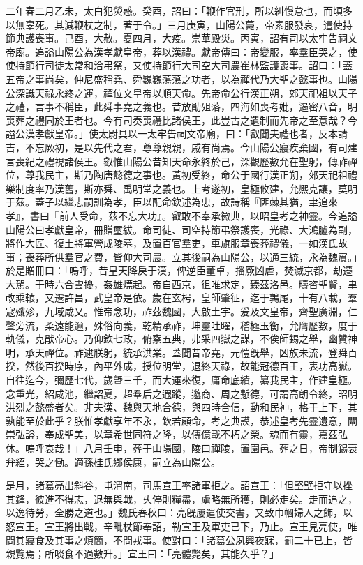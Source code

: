 \begin{pinyinscope}
二年春二月乙未，太白犯熒惑。癸酉，詔曰：「鞭作官刑，所以糾慢怠也，而頃多以無辜死。其減鞭杖之制，著于令。」三月庚寅，山陽公薨，帝素服發哀，遣使持節典護喪事。己酉，大赦。夏四月，大疫。崇華殿災。丙寅，詔有司以太牢告祠文帝廟。追謚山陽公為漢孝獻皇帝，葬以漢禮。獻帝傳曰：帝變服，率羣臣哭之，使使持節行司徒太常和洽弔祭，又使持節行大司空大司農崔林監護喪事。詔曰：「蓋五帝之事尚矣，仲尼盛稱堯、舜巍巍蕩蕩之功者，以為禪代乃大聖之懿事也。山陽公深識天祿永終之運，禪位文皇帝以順天命。先帝命公行漢正朔，郊天祀祖以天子之禮，言事不稱臣，此舜事堯之義也。昔放勛殂落，四海如喪考妣，遏密八音，明喪葬之禮同於王者也。今有司奏喪禮比諸侯王，此豈古之遺制而先帝之至意哉？今謚公漢孝獻皇帝。」使太尉具以一太牢告祠文帝廟，曰：「叡聞夫禮也者，反本請吉，不忘厥初，是以先代之君，尊尊親親，戚有尚焉。今山陽公寢疾棄國，有司建言喪紀之禮視諸侯王。叡惟山陽公昔知天命永終於己，深觀歷數允在聖躬，傳祚禪位，尊我民主，斯乃陶唐懿德之事也。黃初受終，命公于國行漢正朔，郊天祀祖禮樂制度率乃漢舊，斯亦舜、禹明堂之義也。上考遂初，皇極攸建，允熈克讓，莫明于茲。蓋子以繼志嗣訓為孝，臣以配命欽述為忠，故詩稱『匪棘其猶，聿追來孝』，書曰『前人受命，茲不忘大功』。叡敢不奉承徽典，以昭皇考之神靈。今追謚山陽公曰孝獻皇帝，冊贈璽紱。命司徒、司空持節弔祭護喪，光祿、大鴻臚為副，將作大匠、復土將軍營成陵墓，及置百官羣吏，車旗服章喪葬禮儀，一如漢氏故事；喪葬所供羣官之費，皆仰大司農。立其後嗣為山陽公，以通三統，永為魏賔。」於是贈冊曰：「嗚呼，昔皇天降戾于漢，俾逆臣董卓，播厥凶虐，焚滅京都，劫遷大駕。于時六合雲擾，姦雄熛起。帝自西京，徂唯求定，臻茲洛邑。疇咨聖賢，聿改乘轅，又遷許昌，武皇帝是依。歲在玄枵，皇師肇征，迄于鶉尾，十有八載，羣寇殲殄，九域咸乂。惟帝念功，祚茲魏國，大啟土宇。爰及文皇帝，齊聖廣淵，仁聲旁流，柔遠能邇，殊俗向義，乾精承祚，坤靈吐曜，稽極玉衡，允膺歷數，度于軌儀，克猒帝心。乃仰欽七政，俯察五典，弗采四嶽之謀，不俟師錫之舉，幽贊神明，承天禪位。祚逮朕躬，統承洪業。蓋聞昔帝堯，元愷旣舉，凶族未流，登舜百揆，然後百揆時序，內平外成，授位明堂，退終天祿，故能冠德百王，表功高嶽。自往迄今，彌歷七代，歲曁三千，而大運來復，庸命底績，纂我民主，作建皇極。念重光，紹咸池，繼韶夏，超羣后之遐蹤，邈商、周之慙德，可謂高朗令終，昭明洪烈之懿盛者矣。非夫漢、魏與天地合德，與四時合信，動和民神，格于上下，其孰能至於此乎？朕惟孝獻享年不永，欽若顧命，考之典謨，恭述皇考先靈遺意，闡崇弘謚，奉成聖美，以章希世同符之隆，以傳億載不朽之榮。魂而有靈，嘉茲弘休。嗚呼哀哉！」八月壬申，葬于山陽國，陵曰禪陵，置園邑。葬之日，帝制錫衰弁絰，哭之慟。適孫桂氏鄉侯康，嗣立為山陽公。

是月，諸葛亮出斜谷，屯渭南，司馬宣王率諸軍拒之。詔宣王：「但堅壁拒守以挫其鋒，彼進不得志，退無與戰，乆停則糧盡，虜略無所獲，則必走矣。走而追之，以逸待勞，全勝之道也。」魏氏春秋曰：亮旣屢遣使交書，又致巾幗婦人之飾，以怒宣王。宣王將出戰，辛毗杖節奉詔，勒宣王及軍吏已下，乃止。宣王見亮使，唯問其寢食及其事之煩簡，不問戎事。使對曰：「諸葛公夙興夜寐，罰二十已上，皆親覽焉；所啖食不過數升。」宣王曰：「亮體斃矣，其能久乎？」


\end{pinyinscope}
